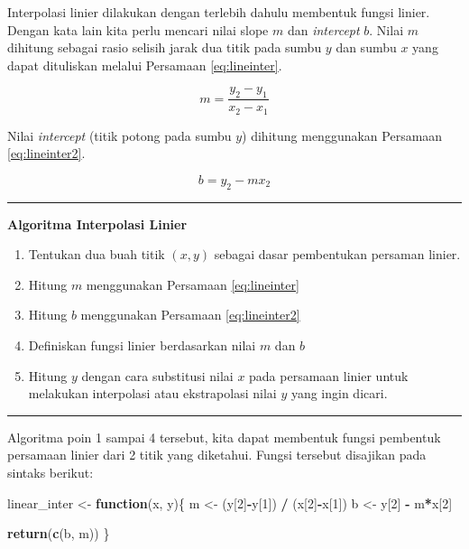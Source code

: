 \documentclass[]{book}
\newenvironment{Shaded}{\begin{snugshade}}{\end{snugshade}}
\newcommand{\ControlFlowTok}[1]{\textcolor[rgb]{0.13,0.29,0.53}{\textbf{#1}}}
\newcommand{\DecValTok}[1]{\textcolor[rgb]{0.00,0.00,0.81}{#1}}
\newcommand{\KeywordTok}[1]{\textcolor[rgb]{0.13,0.29,0.53}{\textbf{#1}}}
\newcommand{\NormalTok}[1]{#1}
\newcommand{\OperatorTok}[1]{\textcolor[rgb]{0.81,0.36,0.00}{\textbf{#1}}}
\newcommand{\StringTok}[1]{\textcolor[rgb]{0.31,0.60,0.02}{#1}}
\providecommand{\tightlist}{%
  \setlength{\itemsep}{0pt}\setlength{\parskip}{0pt}}
\theoremstyle{definition}
\theoremstyle{definition}
\theoremstyle{definition}
\theoremstyle{remark}
\begin{document}
Interpolasi linier dilakukan dengan terlebih dahulu membentuk fungsi linier. Dengan kata lain kita perlu mencari nilai slope \(m\) dan \emph{intercept} \(b\). Nilai \(m\) dihitung sebagai rasio selisih jarak dua titik pada sumbu \(y\) dan sumbu \(x\) yang dapat dituliskan melalui Persamaan \eqref{eq:lineinter}.

\begin{equation}
m=\frac{y_2-y_1}{x_2-x_1}
  \label{eq:lineinter}
\end{equation}

Nilai \emph{intercept} (titik potong pada sumbu \(y\)) dihitung menggunakan Persamaan \eqref{eq:lineinter2}.

\begin{equation}
b=y_2-mx_2
  \label{eq:lineinter2}
\end{equation}

\begin{center}\rule{0.5\linewidth}{\linethickness}\end{center}

\textbf{Algoritma Interpolasi Linier}

\begin{enumerate}
\def\labelenumi{\arabic{enumi}.}
\tightlist
\item
  Tentukan dua buah titik \(\left(x,y\right)\) sebagai dasar pembentukan persaman linier.
\item
  Hitung \(m\) menggunakan Persamaan \eqref{eq:lineinter}
\item
  Hitung \(b\) menggunakan Persamaan \eqref{eq:lineinter2}
\item
  Definiskan fungsi linier berdasarkan nilai \(m\) dan \(b\)
\item
  Hitung \(y\) dengan cara substitusi nilai \(x\) pada persamaan linier untuk melakukan interpolasi atau ekstrapolasi nilai \(y\) yang ingin dicari.
\end{enumerate}

\begin{center}\rule{0.5\linewidth}{\linethickness}\end{center}

Algoritma poin 1 sampai 4 tersebut, kita dapat membentuk fungsi pembentuk persamaan linier dari 2 titik yang diketahui. Fungsi tersebut disajikan pada sintaks berikut:

\begin{Shaded}
\begin{Highlighting}[]
\NormalTok{linear_inter <-}\StringTok{ }\ControlFlowTok{function}\NormalTok{(x, y)\{}
\NormalTok{  m <-}\StringTok{ }\NormalTok{(y[}\DecValTok{2}\NormalTok{]}\OperatorTok{-}\NormalTok{y[}\DecValTok{1}\NormalTok{]) }\OperatorTok{/}\StringTok{ }\NormalTok{(x[}\DecValTok{2}\NormalTok{]}\OperatorTok{-}\NormalTok{x[}\DecValTok{1}\NormalTok{])}
\NormalTok{  b <-}\StringTok{ }\NormalTok{y[}\DecValTok{2}\NormalTok{] }\OperatorTok{-}\StringTok{ }\NormalTok{m}\OperatorTok{*}\NormalTok{x[}\DecValTok{2}\NormalTok{]}
  
  \KeywordTok{return}\NormalTok{(}\KeywordTok{c}\NormalTok{(b, m))}
\NormalTok{\}}
\end{Highlighting}
\end{Shaded}
\end{document}
